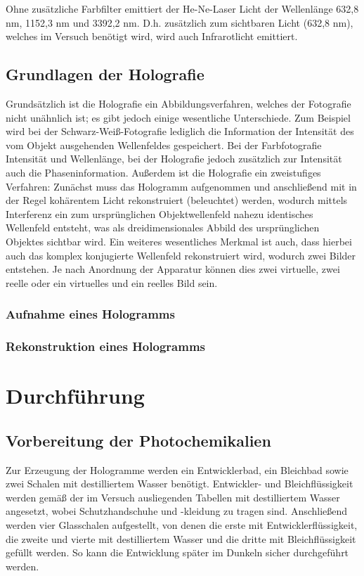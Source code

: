 \documentclass[bigchapter,colorback,accentcolor=tud4b,linedtoc,11pt]{tudreport}
\begin{document}
Ohne zusätzliche Farbfilter emittiert der He-Ne-Laser Licht der Wellenlänge 632,8 nm, 1152,3 nm und 3392,2 nm. D.h. zusätzlich zum sichtbaren Licht (632,8 nm), welches im Versuch benötigt wird, wird auch Infrarotlicht emittiert. 

\section{Grundlagen der Holografie}

Grundsätzlich ist die Holografie ein Abbildungsverfahren, welches der Fotografie nicht unähnlich ist; es gibt jedoch einige wesentliche Unterschiede. Zum Beispiel wird bei der Schwarz-Weiß-Fotografie lediglich die Information der Intensität des vom Objekt ausgehenden Wellenfeldes gespeichert. Bei der Farbfotografie Intensität und Wellenlänge, bei der Holografie jedoch zusätzlich zur Intensität auch die Phaseninformation. Außerdem ist die Holografie ein zweistufiges Verfahren: Zunächst muss das Hologramm aufgenommen und anschließend mit in der Regel kohärentem Licht rekonstruiert (beleuchtet) werden, wodurch mittels Interferenz ein zum ursprünglichen Objektwellenfeld nahezu identisches Wellenfeld entsteht, was als dreidimensionales Abbild des ursprünglichen Objektes sichtbar wird. Ein weiteres wesentliches Merkmal ist auch, dass hierbei auch das komplex konjugierte Wellenfeld rekonstruiert wird, wodurch zwei Bilder entstehen. Je nach Anordnung der Apparatur können dies zwei virtuelle, zwei reelle oder ein virtuelles und ein reelles Bild sein.

\subsection{Aufnahme eines Hologramms}

\subsection{Rekonstruktion eines Hologramms}

\chapter{Durchführung}

\section{Vorbereitung der Photochemikalien}

Zur Erzeugung der Hologramme werden ein Entwicklerbad, ein Bleichbad sowie zwei Schalen mit destilliertem Wasser benötigt. Entwickler- und Bleichflüssigkeit werden gemäß der im Versuch ausliegenden Tabellen mit destilliertem Wasser angesetzt, wobei Schutzhandschuhe und -kleidung zu tragen sind. Anschließend werden vier Glasschalen aufgestellt, von denen die erste mit Entwicklerflüssigkeit, die zweite und vierte mit destilliertem Wasser und die dritte mit Bleichflüssigkeit gefüllt werden. So kann die Entwicklung später im Dunkeln sicher durchgeführt werden.
\end{document}
